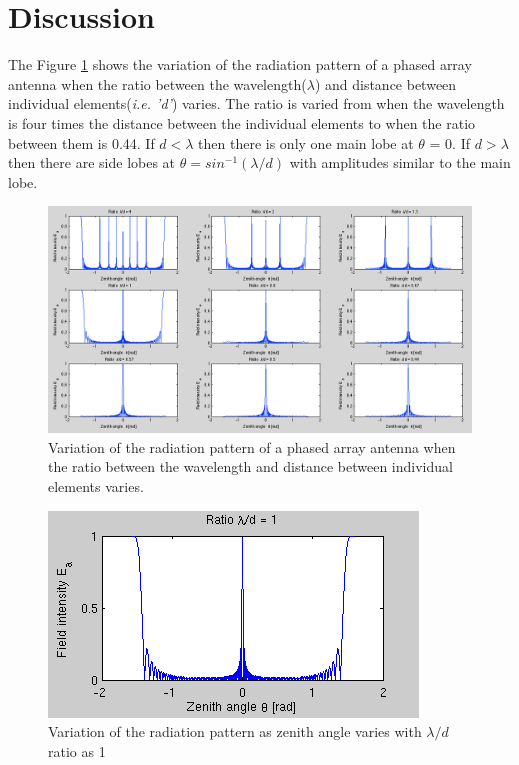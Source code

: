 \documentclass{article}
\begin{document}

\section{Discussion}

The Figure \ref{fig:ratio} shows the variation of the radiation pattern of a phased array antenna when the ratio between the wavelength($\lambda$) and distance between individual elements(\textit{i.e. 'd'}) varies. The ratio is varied from when the wavelength is four times the distance between the individual elements to when the ratio between them is 0.44. If $d<\lambda$ then there is only one main lobe at $\theta $ = 0. If $d>\lambda $ then there are side lobes at $\theta = sin^{-1}(\lambda/d)$ with amplitudes similar to the main lobe.\\

\begin{figure}[htb]
\centering
\includegraphics[width=\textwidth]{Figures/ratio.png}
\caption{Variation of the radiation pattern of a phased array antenna when the ratio between the wavelength and distance between individual elements varies.}
\label{fig:ratio}
\end{figure}

\begin{figure}[h!]
\centering
\includegraphics[width=\textwidth]{Figures/ratio_1.png}
\caption{Variation of the radiation pattern as zenith angle varies with $\lambda/d$ ratio as 1}
\label{fig:ratio_1}
\end{figure}
\end{document}
